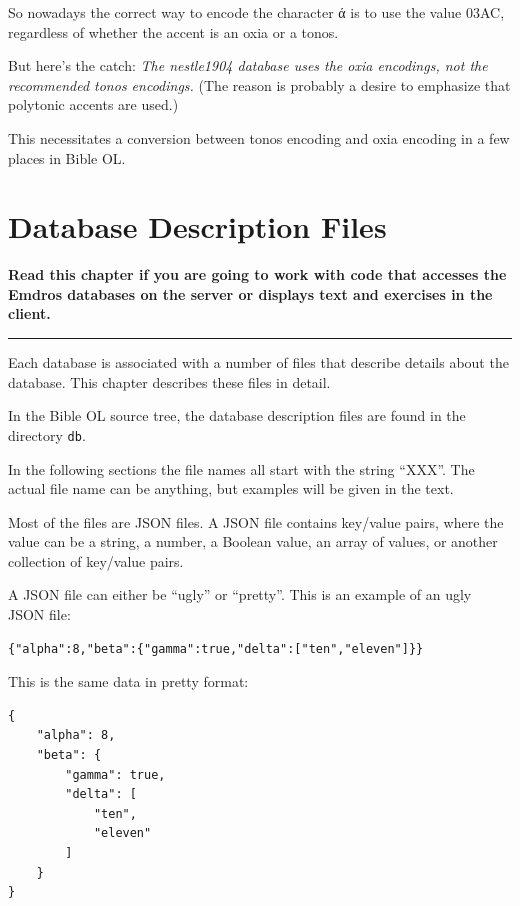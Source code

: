 \documentclass[11pt,oneside,a4paper]{memoir}
\begin{document}
So nowadays the correct way to encode the character ά is to use the value 03AC, regardless of
whether the accent is an oxia or a tonos.

But here's the catch: \emph{The nestle1904 database uses the oxia encodings, not the recommended tonos
encodings.} (The reason is probably a desire to emphasize that polytonic accents are used.)

This necessitates a conversion between tonos encoding and oxia encoding in a few places in Bible OL.




\chapter{Database Description Files}

\textbf{Read this chapter if you are going to work with code that accesses the Emdros databases on
  the server or displays text and exercises in the client.}
\plainbreak{3}


Each database is associated with a number of files that describe details about the database. This
chapter describes these files in detail.

In the Bible OL source tree, the database description files are found in the directory \texttt{db}.

In the following sections the file names all start with the string ``XXX''. The actual file name can
be anything, but examples will be given in the text.

Most of the files are JSON files. A JSON file contains key/value pairs, where the value can be
a string, a number, a Boolean value, an array of values, or another collection of key/value pairs.

A JSON file can either be ``ugly'' or ``pretty''. This is an example of an ugly JSON file:

\begin{lstlisting}
{"alpha":8,"beta":{"gamma":true,"delta":["ten","eleven"]}}
\end{lstlisting}

This is the same data in pretty format:

\begin{lstlisting}
{
    "alpha": 8,
    "beta": {
        "gamma": true,
        "delta": [
            "ten",
            "eleven"
        ]
    }
}
\end{lstlisting}
\end{document}
